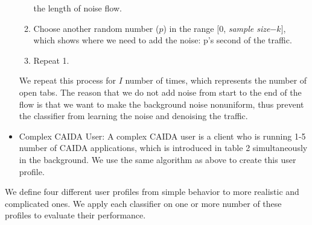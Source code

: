 \begin{itemize}
\begin{enumerate}
 the length of noise flow. 
 \item  Choose another random number ($p$) in the range $[0$,  \textit{sample size}$ - k]$, which shows where we
 need to add the noise: p's second of the \bc traffic.
 \item Repeat 1.
\end{enumerate}
We repeat this process for $I$ number of times, which represents the number of open tabs. The reason that we do not add noise from start to the end of the flow is that we want to make the background noise nonuniform, thus prevent the classifier from learning the noise and denoising the traffic.
    \item Complex CAIDA User: A complex CAIDA user is a \bc client who is running 1-5 number of CAIDA applications, which is introduced in table 2 simultaneously in the background. We use the same algorithm as above to create this user profile.
\end{itemize}    
We define four different user profiles from simple behavior to more realistic and complicated ones. We apply each classifier on one or more number of these profiles to evaluate their performance.


